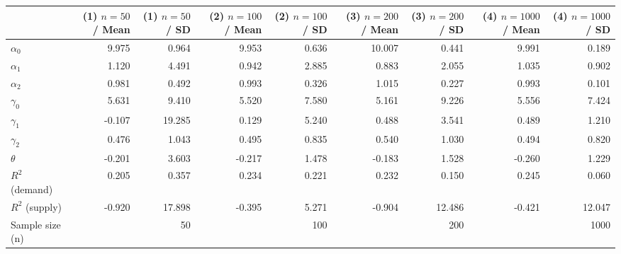 
\begin{tabular}[t]{lrrrrrrrr}
\toprule
  & (1) $n=50$ / Mean & (1) $n=50$ / SD & (2) $n=100$ / Mean & (2) $n=100$ / SD & (3) $n=200$ / Mean & (3) $n=200$ / SD & (4) $n=1000$ / Mean & (4) $n=1000$ / SD\\
\midrule
$\alpha_{0}$ & 9.975 & 0.964 & 9.953 & 0.636 & 10.007 & 0.441 & 9.991 & 0.189\\
$\alpha_{1}$ & 1.120 & 4.491 & 0.942 & 2.885 & 0.883 & 2.055 & 1.035 & 0.902\\
$\alpha_{2}$ & 0.981 & 0.492 & 0.993 & 0.326 & 1.015 & 0.227 & 0.993 & 0.101\\
$\gamma_{0}$ & 5.631 & 9.410 & 5.520 & 7.580 & 5.161 & 9.226 & 5.556 & 7.424\\
$\gamma_{1}$ & -0.107 & 19.285 & 0.129 & 5.240 & 0.488 & 3.541 & 0.489 & 1.210\\
$\gamma_{2}$ & 0.476 & 1.043 & 0.495 & 0.835 & 0.540 & 1.030 & 0.494 & 0.820\\
$\theta$ & -0.201 & 3.603 & -0.217 & 1.478 & -0.183 & 1.528 & -0.260 & 1.229\\
$R^{2}$ (demand) & 0.205 & 0.357 & 0.234 & 0.221 & 0.232 & 0.150 & 0.245 & 0.060\\
$R^{2}$ (supply) & -0.920 & 17.898 & -0.395 & 5.271 & -0.904 & 12.486 & -0.421 & 12.047\\
Sample size (n) &  & 50 &  & 100 &  & 200 &  & 1000\\
\bottomrule
\end{tabular}
